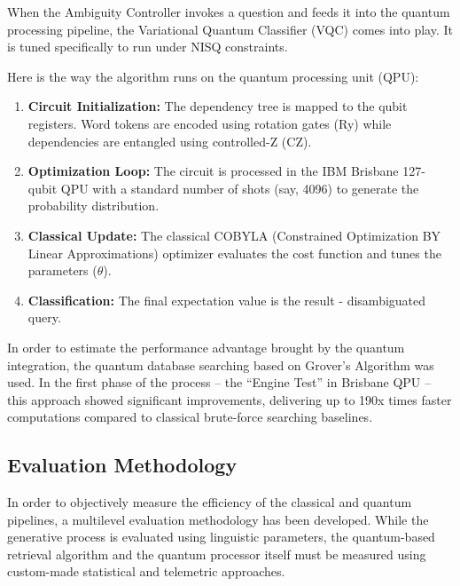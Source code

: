 When the Ambiguity Controller invokes a question and feeds it into the quantum processing pipeline, the Variational Quantum Classifier (VQC) comes into play. It is tuned specifically to run under NISQ constraints.

Here is the way the algorithm runs on the quantum processing unit (QPU):
\begin{enumerate}
	\item \textbf{Circuit Initialization:} The dependency tree is mapped to the qubit registers. Word tokens are encoded using rotation gates (Ry) while dependencies are entangled using controlled-Z (CZ).
	\item \textbf{Optimization Loop:} The circuit is processed in the IBM Brisbane 127-qubit QPU with a standard number of shots (say, 4096) to generate the probability distribution.
	\item \textbf{Classical Update:} The classical COBYLA (Constrained Optimization BY Linear Approximations) optimizer evaluates the cost function and tunes the parameters ($\theta$).
	\item \textbf{Classification:} The final expectation value is the result - disambiguated query.
\end{enumerate}

In order to estimate the performance advantage brought by the quantum integration, the quantum database searching based on Grover’s Algorithm was used. In the first phase of the process – the “Engine Test” in Brisbane QPU – this approach showed significant improvements, delivering up to 190x times faster computations compared to classical brute-force searching baselines.

\subsection{Evaluation Methodology}

In order to objectively measure the efficiency of the classical and quantum pipelines, a multilevel evaluation methodology has been developed. While the generative process is evaluated using linguistic parameters, the quantum-based retrieval algorithm and the quantum processor itself must be measured using custom-made statistical and telemetric approaches.

